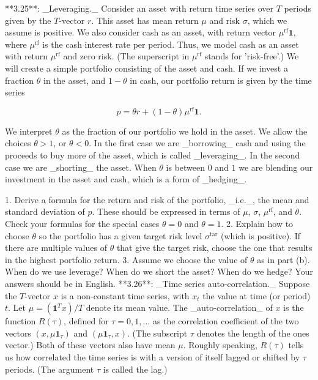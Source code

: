 

**3.25**: _Leveraging._ Consider an asset with return time series over \(T\) periods given by the \(T\)-vector \(r\). This asset has mean return \(\mu\) and risk \(\sigma\), which we assume is positive. We also consider cash as an asset, with return vector \(\mu^{\mathrm{rf}}\mathbf{1}\), where \(\mu^{\mathrm{rf}}\) is the cash interest rate per period. Thus, we model cash as an asset with return \(\mu^{\mathrm{rf}}\) and zero risk. (The superscript in \(\mu^{\mathrm{rf}}\) stands for 'risk-free'.) We will create a simple portfolio consisting of the asset and cash. If we invest a fraction \(\theta\) in the asset, and \(1-\theta\) in cash, our portfolio return is given by the time series

\[p=\theta r+(1-\theta)\mu^{\mathrm{rf}}\mathbf{1}.\]

We interpret \(\theta\) as the fraction of our portfolio we hold in the asset. We allow the choices \(\theta>1\), or \(\theta<0\). In the first case we are _borrowing_ cash and using the proceeds to buy more of the asset, which is called _leveraging_. In the second case we are _shorting_ the asset. When \(\theta\) is between \(0\) and \(1\) we are blending our investment in the asset and cash, which is a form of _hedging_.

1. Derive a formula for the return and risk of the portfolio, _i.e._, the mean and standard deviation of \(p\). These should be expressed in terms of \(\mu\), \(\sigma\), \(\mu^{\mathrm{rf}}\), and \(\theta\). Check your formulas for the special cases \(\theta=0\) and \(\theta=1\).
2. Explain how to choose \(\theta\) so the portfolio has a given target risk level \(\sigma^{\mathrm{tar}}\) (which is positive). If there are multiple values of \(\theta\) that give the target risk, choose the one that results in the highest portfolio return.
3. Assume we choose the value of \(\theta\) as in part (b). When do we use leverage? When do we short the asset? When do we hedge? Your answers should be in English.
**3.26**: _Time series auto-correlation._ Suppose the \(T\)-vector \(x\) is a non-constant time series, with \(x_{t}\) the value at time (or period) \(t\). Let \(\mu=(\mathbf{1}^{T}x)/T\) denote its mean value. The _auto-correlation_ of \(x\) is the function \(R(\tau)\), defined for \(\tau=0,1,\ldots\) as the correlation coefficient of the two vectors \((x,\mu\mathbf{1}_{\tau})\) and \((\mu\mathbf{1}_{\tau},x)\). (The subscript \(\tau\) denotes the length of the ones vector.) Both of these vectors also have mean \(\mu\). Roughly speaking, \(R(\tau)\) tells us how correlated the time series is with a version of itself lagged or shifted by \(\tau\) periods. (The argument \(\tau\) is called the lag.)

